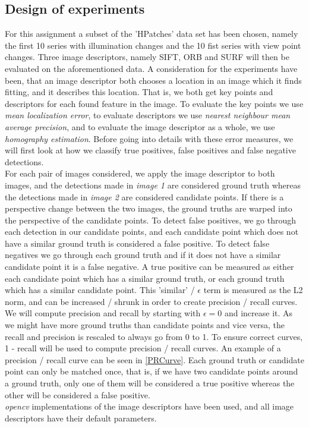 \subsection{Design of experiments}
For this assignment a subset of the 'HPatches' data set has been chosen, namely the first 10 series with illumination changes and the 10 fist series with view point changes. Three image descriptors, namely SIFT, ORB and SURF will then be evaluated on the aforementioned data. A consideration for the experiments have been, that an image descriptor both chooses a location in an image which it finds fitting, and it describes this location. That is, we both get key points and descriptors for each found feature in the image. To evaluate the key points we use \textit{mean localization error}, to evaluate descriptors we use \textit{nearest neighbour mean average precision}, and to evaluate the image descriptor as a whole, we use \textit{homography estimation}. Before going into details with these error measures, we will first look at how we classify true positives, false positives and false negative detections.\\
For each pair of images considered, we apply the image descriptor to both images, and the detections made in \textit{image 1} are considered ground truth whereas the detections made in \textit{image 2} are considered candidate points. If there is a perspective change between the two images, the ground truths are warped into the perspective of the candidate points. To detect false positives, we go through each detection in our candidate points, and each candidate point which does not have a similar ground truth is considered a false positive. To detect false negatives we go through each ground truth and if it does not have a similar candidate point it is a false negative. A true positive can be measured as either each candidate point which has a similar ground truth, or each ground truth which has a similar candidate point. This 'similar' / $\epsilon$ term is measured as the L2 norm, and can be increased / shrunk in order to create precision / recall curves. We will compute precision and recall by starting with $\epsilon = 0$ and increase it.
As we might have more ground truths than candidate points and vice versa, the recall and precision is rescaled to always go from 0 to 1. 
To ensure correct curves, 1 - recall will be used to compute precision / recall curves. An example of a precision / recall curve can be seen in \autoref{PRCurve}. Each ground truth or candidate point can only be matched once, that is, if we have two candidate points around a ground truth, only one of them will be considered a true positive whereas the other will be considered a false positive.\\
\textit{opencv} implementations of the image descriptors have been used, and all image descriptors have their default parameters.

